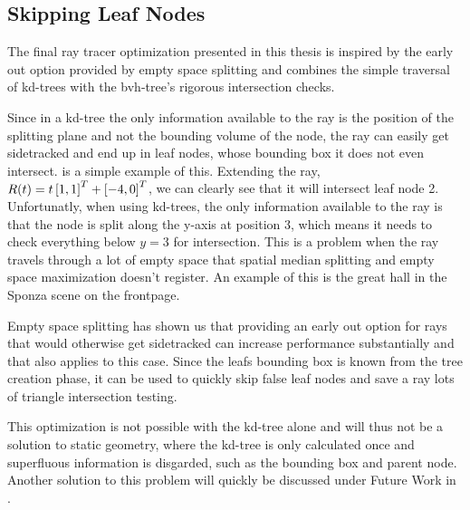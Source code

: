 \subsection{Skipping Leaf Nodes}


The final ray tracer optimization presented in this thesis is inspired
by the early out option provided by empty space splitting and combines
the simple traversal of kd-trees with the bvh-tree's rigorous
intersection checks.

Since in a kd-tree the only information available to the ray is the
position of the splitting plane and not the bounding volume of the
node, the ray can easily get sidetracked and end up in leaf nodes,
whose bounding box it does not even intersect. 
is a simple example of this. Extending the ray, $R(t) = t
\left[1, 1 \right]^T + \left[-4, 0 \right]^T$, we can clearly see that it will
intersect leaf node 2. Unfortunatly, when using kd-trees, the only
information available to the ray is that the node is split along the
y-axis at position 3, which means it needs to check everything below
$y=3$ for intersection. This is a problem when the ray travels through
a lot of empty space that spatial median splitting and empty space
maximization doesn't register. An example of this is the great hall in
the Sponza scene on the frontpage.

Empty space splitting has shown us that providing an early out option
for rays that would otherwise get sidetracked can increase performance
substantially and that also applies to this case. Since the leafs
bounding box is known from the tree creation phase, it can be used to
quickly skip false leaf nodes and save a ray lots of triangle
intersection testing.

This optimization is not possible with the kd-tree alone and will thus
not be a solution to static geometry, where the kd-tree is only
calculated once and superfluous information is disgarded, such as the
bounding box and parent node. Another solution to this problem will
quickly be discussed under Future Work in .

